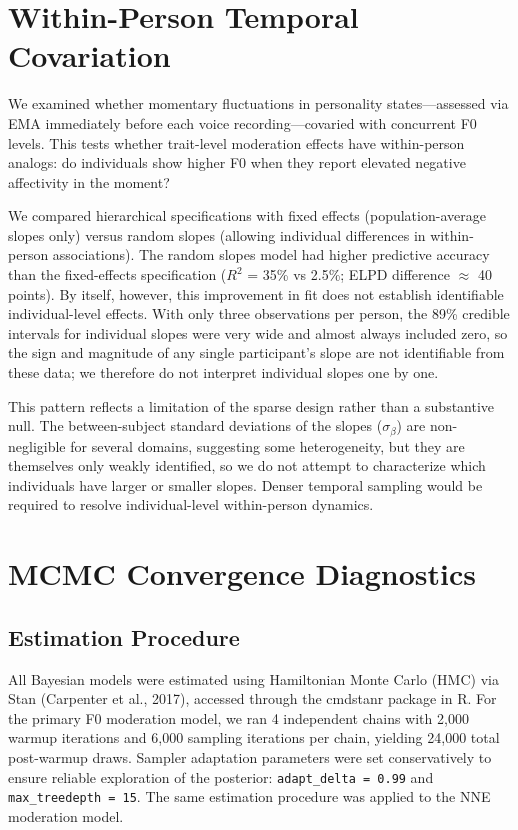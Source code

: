 \documentclass[
  english,
  man,floatsintext]{apa6}
\begin{document}
\section{Within-Person Temporal Covariation}\label{within-person-temporal-covariation}

We examined whether momentary fluctuations in personality states---assessed via EMA immediately before each voice recording---covaried with concurrent F0 levels. This tests whether trait-level moderation effects have within-person analogs: do individuals show higher F0 when they report elevated negative affectivity in the moment?

We compared hierarchical specifications with fixed effects (population-average slopes only) versus random slopes (allowing individual differences in within-person associations). The random slopes model had higher predictive accuracy than the fixed-effects specification (\(R^2\) = 35\% vs 2.5\%; ELPD difference \(\approx\) 40 points). By itself, however, this improvement in fit does not establish identifiable individual-level effects. With only three observations per person, the 89\% credible intervals for individual slopes were very wide and almost always included zero, so the sign and magnitude of any single participant's slope are not identifiable from these data; we therefore do not interpret individual slopes one by one.

This pattern reflects a limitation of the sparse design rather than a substantive null. The between-subject standard deviations of the slopes (\(\sigma_\beta\)) are non-negligible for several domains, suggesting some heterogeneity, but they are themselves only weakly identified, so we do not attempt to characterize which individuals have larger or smaller slopes. Denser temporal sampling would be required to resolve individual-level within-person dynamics.

\newpage

\section{MCMC Convergence Diagnostics}\label{mcmc-convergence-diagnostics}

\subsection{Estimation Procedure}\label{estimation-procedure}

All Bayesian models were estimated using Hamiltonian Monte Carlo (HMC) via Stan (Carpenter et al., 2017), accessed through the cmdstanr package in R. For the primary F0 moderation model, we ran 4 independent chains with 2,000 warmup iterations and 6,000 sampling iterations per chain, yielding 24,000 total post-warmup draws. Sampler adaptation parameters were set conservatively to ensure reliable exploration of the posterior: \texttt{adapt\_delta\ =\ 0.99} and \texttt{max\_treedepth\ =\ 15}. The same estimation procedure was applied to the NNE moderation model.
\end{document}
